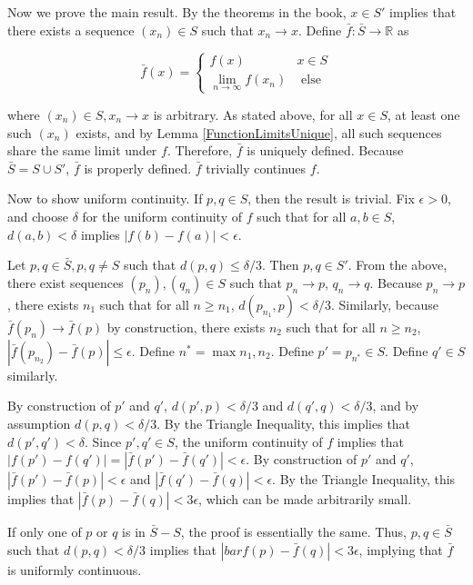 \documentclass{article}
\newcommand{\R}{\mathbb{R}}
\begin{document}
Now we prove the main result. By the theorems in the book, $x \in S'$ implies that there exists a sequence $(x_n) \in S$ such that $x_n \rightarrow x$. Define $\bar{f}: \bar{S} \rightarrow \R$ as

\[
\bar{f}(x) = 
\begin{cases}
f(x) & x \in S \\
\lim_{n \rightarrow \infty} f(x_n) & \text{ else}
\end{cases}
\]

where $(x_n) \in S, x_n \rightarrow x$ is arbitrary. As stated above, for all $x \in S$, at least one such $(x_n)$ exists, and by Lemma \ref{FunctionLimitsUnique}, all such sequences share the same limit under $f$. Therefore, $\bar{f}$ is uniquely defined. Because $\bar{S} = S \cup S'$, $\bar{f}$ is properly defined. $\bar{f}$ trivially continues $f$.

Now to show uniform continuity. If $p, q \in S$, then the result is trivial. Fix $\epsilon > 0$, and choose $\delta$ for the uniform continuity of $f$ such that for all $a, b \in S$, $d(a, b) < \delta$ implies $|f(b) - f(a)| < \epsilon$.

Let $p, q \in \bar{S}, p, q \neq S$ such that $d(p, q) \leq \delta/3$. Then $p, q \in S'$. From the above, there exist sequences $(p_n), (q_n) \in S$ such that $p_n \rightarrow p$, $q_n \rightarrow q$. Because $p_n \rightarrow p$, there exists $n_1$ such that for all $n \geq n_1$, $d(p_{n_1}, p) < \delta/3$. Similarly, because $\bar{f}(p_n) \rightarrow \bar{f}(p)$ by construction, there exists $n_2$ such that for all $n \geq n_2$, $|\bar{f}(p_{n_2}) - \bar{f}(p)| \leq \epsilon$. Define $n^* = \max{n_1, n_2}$. Define $p' = p_{n^*} \in S$. Define $q' \in S$ similarly.

By construction of $p'$ and $q'$, $d(p', p) < \delta/3$ and $d(q', q) < \delta/3$, and by assumption $d(p, q) < \delta/3$. By the Triangle Inequality, this implies that $d(p', q') < \delta$. Since $p', q' \in S$, the uniform continuity of $f$ implies that $|f(p') - f(q')| = |\bar{f}(p') - \bar{f}(q')| < \epsilon$. By construction of $p'$ and $q'$, $|\bar{f}(p') - \bar{f}(p)| < \epsilon$ and $|\bar{f}(q') - \bar{f}(q)| < \epsilon$. By the Triangle Inequality, this implies that $|\bar{f}(p) - \bar{f}(q)| < 3\epsilon$, which can be made arbitrarily small.

If only one of $p$ or $q$ is in $\bar{S} - S$, the proof is essentially the same. Thus, $p, q \in \bar{S}$ such that $d(p, q) < \delta/3$ implies that $|bar{f}(p) - \bar{f}(q)| < 3\epsilon$, implying that $\bar{f}$ is uniformly continuous.
\end{document}
